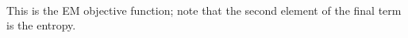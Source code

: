 \documentclass[12pt]{article}
\begin{document}
\begin{equation*}
\begin{split}
    \end{split}
\end{equation*}
This is the EM objective function; note that the second element of the final term is the entropy.\\
\end{document}
